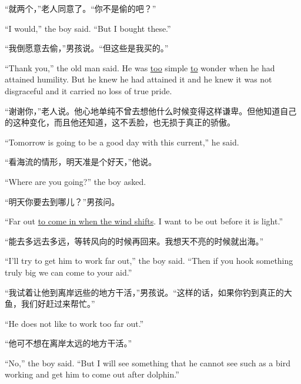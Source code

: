 \begin{paracol}{2}
“就两个，”老人同意了。“你不是偷的吧？”

\switchcolumn*

``I would,'' the boy said. ``But I bought these.''

\switchcolumn

“我倒愿意去偷，”男孩说。“但这些是我买的。”

\switchcolumn*

``Thank you,'' the old man said. He was \uline{too} simple \uline{to}
\gls{wonder} when he had \gls{attained} \gls{humility}. But he knew he had
attained it and he knew it was not \gls{disgraceful} and it carried no loss
of true \gls{pride}.

\switchcolumn

“谢谢你，”老人说。他心地单纯不曾去想他什么时候变得这样谦卑。但他知道自己的这种变化，而且他还知道，这不丢脸，也无损于真正的骄傲。

\switchcolumn*

``Tomorrow is going to be a good day with this current,'' he said.

\switchcolumn

“看海流的情形，明天准是个好天，”他说。

\switchcolumn*

``Where are you going?'' the boy asked.

\switchcolumn

“明天你要去到哪儿？”男孩问。

\switchcolumn*

``Far out \uline{to come in when the wind \glspl{shift}}. I want to be out before it is light.''

\switchcolumn

“能去多远去多远，等转风向的时候再回来。我想天不亮的时候就出海。”

\switchcolumn*

``I'll try to get him to work far out,'' the boy said. ``Then if you \gls{hook} something truly big we can come to your \gls{aid}.''

\switchcolumn

“我试着让他到离岸远些的地方干活，”男孩说。“这样的话，如果你钓到真正的大鱼，我们好赶过来帮忙。”

\switchcolumn*

``He does not like to work too far out.''

\switchcolumn

“他可不想在离岸太远的地方干活。”

\switchcolumn*

``No,'' the boy said. ``But I will see something that he cannot see such as a bird working and get him to come out after \gls{dolphin}.''


\end{paracol}
